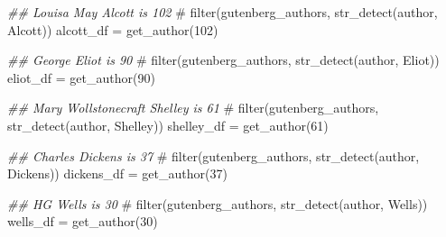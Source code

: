 \documentclass[
]{article}
\newenvironment{Shaded}{\begin{snugshade}}{\end{snugshade}}
\newcommand{\CommentTok}[1]{\textcolor[rgb]{0.37,0.37,0.37}{#1}}
\newcommand{\DecValTok}[1]{\textcolor[rgb]{0.68,0.00,0.00}{#1}}
\newcommand{\DocumentationTok}[1]{\textcolor[rgb]{0.37,0.37,0.37}{\textit{#1}}}
\newcommand{\FunctionTok}[1]{\textcolor[rgb]{0.28,0.35,0.67}{#1}}
\newcommand{\NormalTok}[1]{\textcolor[rgb]{0.00,0.23,0.31}{#1}}
\newcommand{\OtherTok}[1]{\textcolor[rgb]{0.00,0.23,0.31}{#1}}
\begin{document}
\begin{Shaded}
\begin{Highlighting}[]
\DocumentationTok{\#\# Louisa May Alcott is 102}
\CommentTok{\# filter(gutenberg\_authors, str\_detect(author, \textquotesingle{}Alcott\textquotesingle{}))}
\NormalTok{alcott\_df }\OtherTok{=} \FunctionTok{get\_author}\NormalTok{(}\DecValTok{102}\NormalTok{)}
\end{Highlighting}
\end{Shaded}

\begin{Shaded}
\begin{Highlighting}[]
\DocumentationTok{\#\# George Eliot is 90}
\CommentTok{\# filter(gutenberg\_authors, str\_detect(author, \textquotesingle{}Eliot\textquotesingle{}))}
\NormalTok{eliot\_df }\OtherTok{=} \FunctionTok{get\_author}\NormalTok{(}\DecValTok{90}\NormalTok{)}
\end{Highlighting}
\end{Shaded}

\begin{Shaded}
\begin{Highlighting}[]
\DocumentationTok{\#\# Mary Wollstonecraft Shelley is 61}
\CommentTok{\# filter(gutenberg\_authors, str\_detect(author, \textquotesingle{}Shelley\textquotesingle{}))}
\NormalTok{shelley\_df }\OtherTok{=} \FunctionTok{get\_author}\NormalTok{(}\DecValTok{61}\NormalTok{)}
\end{Highlighting}
\end{Shaded}

\begin{Shaded}
\begin{Highlighting}[]
\DocumentationTok{\#\# Charles Dickens is 37}
\CommentTok{\# filter(gutenberg\_authors, str\_detect(author, \textquotesingle{}Dickens\textquotesingle{}))}
\NormalTok{dickens\_df }\OtherTok{=} \FunctionTok{get\_author}\NormalTok{(}\DecValTok{37}\NormalTok{)}
\end{Highlighting}
\end{Shaded}

\begin{Shaded}
\begin{Highlighting}[]
\DocumentationTok{\#\# HG Wells is 30}
\CommentTok{\# filter(gutenberg\_authors, str\_detect(author, \textquotesingle{}Wells\textquotesingle{}))}
\NormalTok{wells\_df }\OtherTok{=} \FunctionTok{get\_author}\NormalTok{(}\DecValTok{30}\NormalTok{)}
\end{Highlighting}
\end{Shaded}
\end{document}
